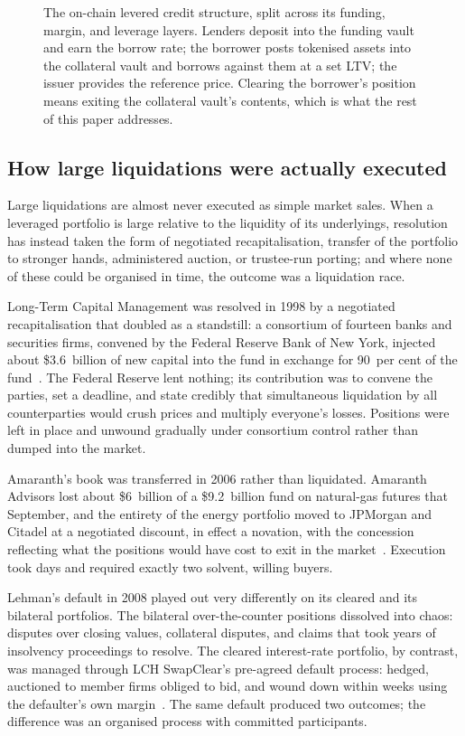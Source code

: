 \documentclass[11pt,a4paper]{article}
\begin{document}
\begin{figure}[h]
\centering
\resizebox{\textwidth}{!}{}
\caption{The on-chain levered credit structure, split across its funding, margin, and leverage layers. Lenders deposit into the funding vault and earn the borrow rate; the borrower posts tokenised assets into the collateral vault and borrows against them at a set LTV; the issuer provides the reference price. Clearing the borrower's position means exiting the collateral vault's contents, which is what the rest of this paper addresses.}
\end{figure}

\subsection{How large liquidations were actually executed}

Large liquidations are almost never executed as simple market sales. When a leveraged portfolio is large relative to the liquidity of its underlyings, resolution has instead taken the form of negotiated recapitalisation, transfer of the portfolio to stronger hands, administered auction, or trustee-run porting; and where none of these could be organised in time, the outcome was a liquidation race.

Long-Term Capital Management was resolved in 1998 by a negotiated recapitalisation that doubled as a standstill: a consortium of fourteen banks and securities firms, convened by the Federal Reserve Bank of New York, injected about \$3.6~billion of new capital into the fund in exchange for 90~per cent of the fund~\cite{ltcm}. The Federal Reserve lent nothing; its contribution was to convene the parties, set a deadline, and state credibly that simultaneous liquidation by all counterparties would crush prices and multiply everyone's losses. Positions were left in place and unwound gradually under consortium control rather than dumped into the market.

Amaranth's book was transferred in 2006 rather than liquidated. Amaranth Advisors lost about \$6~billion of a \$9.2~billion fund on natural-gas futures that September, and the entirety of the energy portfolio moved to JPMorgan and Citadel at a negotiated discount, in effect a novation, with the concession reflecting what the positions would have cost to exit in the market~\cite{amaranth}. Execution took days and required exactly two solvent, willing buyers.

Lehman's default in 2008 played out very differently on its cleared and its bilateral portfolios. The bilateral over-the-counter positions dissolved into chaos: disputes over closing values, collateral disputes, and claims that took years of insolvency proceedings to resolve. The cleared interest-rate portfolio, by contrast, was managed through LCH SwapClear's pre-agreed default process: hedged, auctioned to member firms obliged to bid, and wound down within weeks using the defaulter's own margin~\cite{lch}. The same default produced two outcomes; the difference was an organised process with committed participants.
\end{document}
